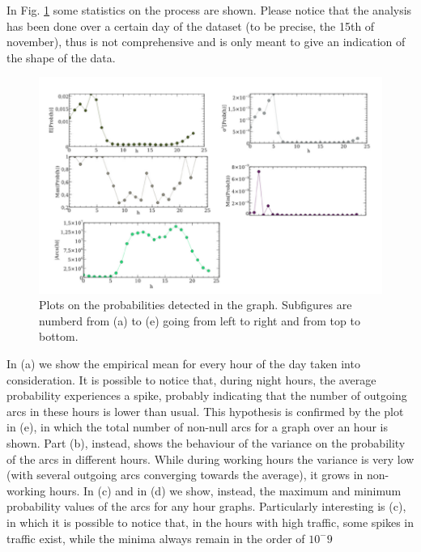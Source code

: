 In Fig. \ref{fig:analysis} some statistics on the process are shown. Please notice that the analysis has been done over 
a certain day of the dataset (to be precise, the 15th of november), thus is not comprehensive and is only meant to give 
an indication of the shape of the data.
\begin{figure}
\centering
\includegraphics[scale=0.7]{arcsanalysis.png}
\caption{\label{fig:analysis}Plots on the probabilities detected in the graph. Subfigures are numberd from (a) to (e) going from left to right and from top to bottom.}
\end{figure}

In (a) we show the empirical mean for every hour of the day taken into consideration. It is possible to notice that, during
night hours, the average probability experiences a spike, probably indicating that the number of outgoing arcs in these 
hours is lower than usual. This hypothesis is confirmed by the plot in (e), in which the total number of non-null arcs
for a graph over an hour is shown.
Part (b), instead, shows the behaviour of the variance on the probability of the arcs in different hours. While during
working hours the variance is very low (with several outgoing arcs converging towards the average), it grows
in non-working hours.
In (c) and in (d) we show, instead, the maximum and minimum probability values of the arcs for any hour graphs. Particularly interesting
is (c), in which it is possible to notice that, in the hours with high traffic, some spikes in traffic exist, while
the minima always remain in the order of $10^-9$ 
